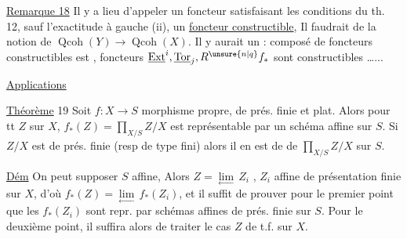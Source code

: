 \uline{Remarque 18} Il y a lieu d'appeler un foncteur  satisfaisant les conditions du th. 12, sauf l'exactitude à gauche (ii), un \uline{foncteur constructible}, Il faudrait   de  la notion de   $\operatorname{Qcoh}(Y)\longrightarrow\operatorname{Qcoh}(X)$. Il y aurait un  : composé de foncteurs constructibles est , foncteurs $\underline{\operatorname{Ext}}^i,\underline{\operatorname{Tor}}_j,R^{\unsure{n|q}} f_*$ sont constructibles \ldots{}...

\begin{center}\uline{Applications}\end{center}

\uline{Théorème} 19 Soit $f:X\longrightarrow S$ morphisme propre, de prés. finie et plat. Alors pour tt $Z$  sur $X$, $f_*(Z)=\displaystyle\prod_{X/S} Z/X$ est représentable par un schéma affine sur $S$. Si $Z/X$ est de prés. finie (resp de type fini) alors il en est de  de $\displaystyle\prod_{X/S}Z/X$ sur $S$.

\uline{Dém} On peut supposer $S$ affine,    Alors $Z=\underset{\longleftarrow}{\lim}\,Z_i$ , $Z_i$ affine de présentation finie sur $X$, d'où $f_*(Z)=\underset{\longleftarrow}{\lim}\,f_*(Z_i)$, et il suffit de prouver pour le premier point que les $f_*(Z_i)$ sont repr. par schémas affines de prés. finie sur $S$. Pour le deuxième point, il suffira alors de traiter le cas $Z$ de t.f. sur $X$.
